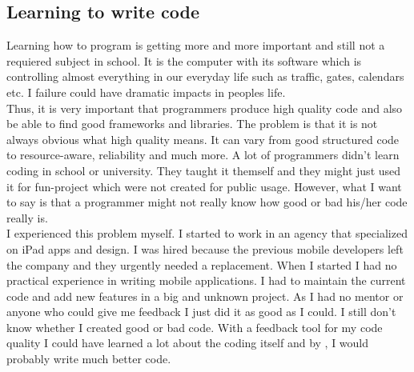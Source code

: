 \subsection{Learning to write code}
Learning how to program is getting more and more important and still not a requiered subject in school. It is the computer with its software which is controlling almost everything in our everyday life such as traffic, gates, calendars etc. I failure could have dramatic impacts in peoples life.\\
Thus, it is very important that programmers produce high quality code and also be able to find good frameworks and libraries. The problem is that it is not always obvious what high quality means. It can vary from good structured code to resource-aware, reliability and much more. A lot of programmers didn't learn coding in school or university. They taught it themself and they might just used it for fun-project which were not created for public usage. However, what I want to say is that a programmer might not really know how good or bad his/her code really is.\\
I experienced this problem myself.
I started to work in an agency that specialized on iPad apps and design. I was hired because the previous mobile developers left the company and they urgently needed a replacement. When I started I had no practical experience in writing mobile applications. I had to maintain the current code and add new features in a big and unknown project. As I had no mentor or anyone who could give me feedback I just did it as good as I could. I still don't know whether I created good or bad code. With a feedback tool for my code quality I could have learned a lot about the coding itself and by , I would probably write much better code.

